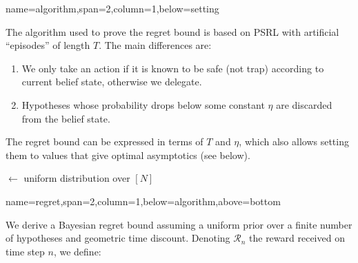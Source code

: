 \documentclass[a0paper,portrait]{baposter}
\begin{document}
\begin{poster}
{name=algorithm,span=2,column=1,below=setting}{
The algorithm used to prove the regret bound is based on PSRL \cite{Osband2013} with artificial \enquote{episodes} of length $T$. The main differences are:
\begin{enumerate}
\item We only take an action if it is known to be safe (not trap) according to current belief state, otherwise we delegate.
\item Hypotheses whose probability drops below some constant $\eta$ are discarded from the belief state.
\end{enumerate}

The regret bound can be expressed in terms of $T$ and $\eta$, which also allows setting them to values that give optimal asymptotics (see below).

\LinesNumbered
\DontPrintSemicolon
{}

\begin{algorithm}[H]


\Z$\leftarrow$ uniform distribution over $[N]$\;

\end{algorithm}

}

{name=regret,span=2,column=1,below=algorithm,above=bottom}
{
We derive a Bayesian regret bound assuming a uniform prior over a finite number of hypotheses and geometric time discount. Denoting $\mathcal{R}_n$ the reward received on time step $n$, we define:

}
\end{poster}
\end{document}
